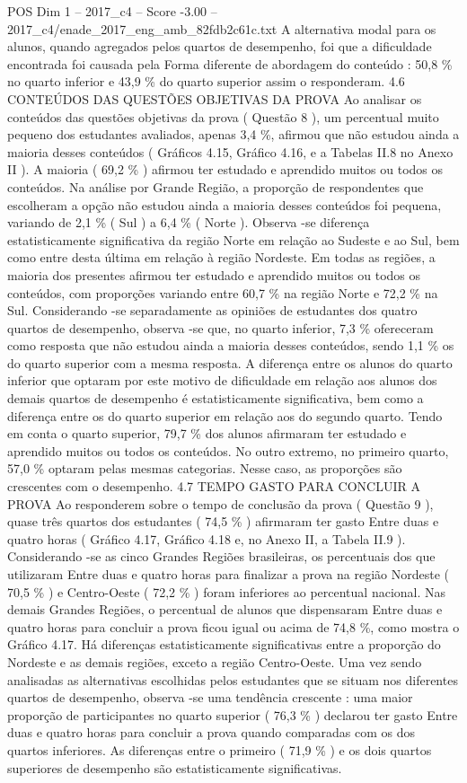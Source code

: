 \begin{textsample}{POS Dim 1 – 2017\_c4 – Score -3.00 – 2017\_c4/enade\_2017\_eng\_amb\_82fdb2c61c.txt}
A alternativa modal para os alunos, quando agregados pelos quartos de desempenho, foi que a dificuldade encontrada foi causada pela Forma diferente de abordagem do conteúdo : 50,8 \% no quarto inferior e 43,9 \% do quarto superior assim o responderam. 4.6 CONTEÚDOS DAS QUESTÕES OBJETIVAS DA PROVA Ao analisar os conteúdos das questões objetivas da prova ( Questão 8 ), um percentual muito pequeno dos estudantes avaliados, apenas 3,4 \%, afirmou que não estudou ainda a maioria desses conteúdos ( Gráficos 4.15, Gráfico 4.16, e a Tabelas II.8 no Anexo II ).
A maioria ( 69,2 \% ) afirmou ter estudado e aprendido muitos ou todos os conteúdos.
Na análise por Grande Região, a proporção de respondentes que escolheram a opção não estudou ainda a maioria desses conteúdos foi pequena, variando de 2,1 \% ( Sul ) a 6,4 \% ( Norte ).
Observa -se diferença estatisticamente significativa da região Norte em relação ao Sudeste e ao Sul, bem como entre desta última em relação à região Nordeste.
Em todas as regiões, a maioria dos presentes afirmou ter estudado e aprendido muitos ou todos os conteúdos, com proporções variando entre 60,7 \% na região Norte e 72,2 \% na Sul.
Considerando -se separadamente as opiniões de estudantes dos quatro quartos de desempenho, observa -se que, no quarto inferior, 7,3 \% ofereceram como resposta que não estudou ainda a maioria desses conteúdos, sendo 1,1 \% os do quarto superior com a mesma resposta.
A diferença entre os alunos do quarto inferior que optaram por este motivo de dificuldade em relação aos alunos dos demais quartos de desempenho é estatisticamente significativa, bem como a diferença entre os do quarto superior em relação aos do segundo quarto.
Tendo em conta o quarto superior, 79,7 \% dos alunos afirmaram ter estudado e aprendido muitos ou todos os conteúdos.
No outro extremo, no primeiro quarto, 57,0 \% optaram pelas mesmas categorias.
Nesse caso, as proporções são crescentes com o desempenho. 4.7 TEMPO GASTO PARA CONCLUIR A PROVA Ao responderem sobre o tempo de conclusão da prova ( Questão 9 ), quase três quartos dos estudantes ( 74,5 \% ) afirmaram ter gasto Entre duas e quatro horas ( Gráfico 4.17, Gráfico 4.18 e, no Anexo II, a Tabela II.9 ).
Considerando -se as cinco Grandes Regiões brasileiras, os percentuais dos que utilizaram Entre duas e quatro horas para finalizar a prova na região Nordeste ( 70,5 \% ) e Centro-Oeste ( 72,2 \% ) foram inferiores ao percentual nacional.
Nas demais Grandes Regiões, o percentual de alunos que dispensaram Entre duas e quatro horas para concluir a prova ficou igual ou acima de 74,8 \%, como mostra o Gráfico 4.17.
Há diferenças estatisticamente significativas entre a proporção do Nordeste e as demais regiões, exceto a região Centro-Oeste.
Uma vez sendo analisadas as alternativas escolhidas pelos estudantes que se situam nos diferentes quartos de desempenho, observa -se uma tendência crescente : uma maior proporção de participantes no quarto superior ( 76,3 \% ) declarou ter gasto Entre duas e quatro horas para concluir a prova quando comparadas com os dos quartos inferiores.
As diferenças entre o primeiro ( 71,9 \% ) e os dois quartos superiores de desempenho são estatisticamente significativas.

\end{textsample}
